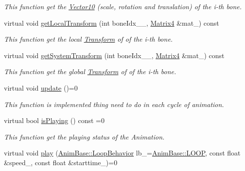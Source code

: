 \begin{DoxyCompactItemize}
\begin{DoxyCompactList}\small\item\em This function get the \hyperlink{class_i_dream_sky_1_1_vector10}{Vector10} (scale, rotation and translation) of the i-\/th bone. \end{DoxyCompactList}\item 
virtual void \hyperlink{class_i_dream_sky_1_1_skeletal_anim_base_a3071b818530589de7f3b28c1300e6135}{get\+Local\+Transform} (int bone\+Idx\+\_\+\+\_\+, \hyperlink{class_i_dream_sky_1_1_matrix4}{Matrix4} \&mat\+\_\+) const 
\begin{DoxyCompactList}\small\item\em This function get the local \hyperlink{class_i_dream_sky_1_1_transform}{Transform} of of the i-\/th bone. \end{DoxyCompactList}\item 
virtual void \hyperlink{class_i_dream_sky_1_1_skeletal_anim_base_abfba256c345b07790b774d0f0b9cc54f}{get\+System\+Transform} (int bone\+Idx\+\_\+\+\_\+, \hyperlink{class_i_dream_sky_1_1_matrix4}{Matrix4} \&mat\+\_\+) const 
\begin{DoxyCompactList}\small\item\em This function get the global \hyperlink{class_i_dream_sky_1_1_transform}{Transform} of of the i-\/th bone. \end{DoxyCompactList}\item 
virtual void \hyperlink{class_i_dream_sky_1_1_skeletal_anim_base_ae27da4b47988780eea5012025fd91109}{update} ()=0
\begin{DoxyCompactList}\small\item\em This function is implemented thing need to do in each cycle of animation. \end{DoxyCompactList}\item 
virtual bool \hyperlink{class_i_dream_sky_1_1_skeletal_anim_base_ac4002b89d9e6cf5cfd9da4e0978ea749}{is\+Playing} () const  =0
\begin{DoxyCompactList}\small\item\em This function get the playing status of the Animation. \end{DoxyCompactList}\item 
virtual void \hyperlink{class_i_dream_sky_1_1_skeletal_anim_base_a0697d0ce16e20098c5c63ff0882362be}{play} (\hyperlink{class_i_dream_sky_1_1_anim_base_aac1c8b7253df068cf02101dcd4f586e2}{Anim\+Base\+::\+Loop\+Behavior} lb\+\_\+=\hyperlink{class_i_dream_sky_1_1_anim_base_aac1c8b7253df068cf02101dcd4f586e2aa119a43717e821f2708795bd94021ea1}{Anim\+Base\+::\+L\+O\+OP}, const float \&speed\+\_, const float \&starttime\+\_)=0

\end{DoxyCompactItemize}
